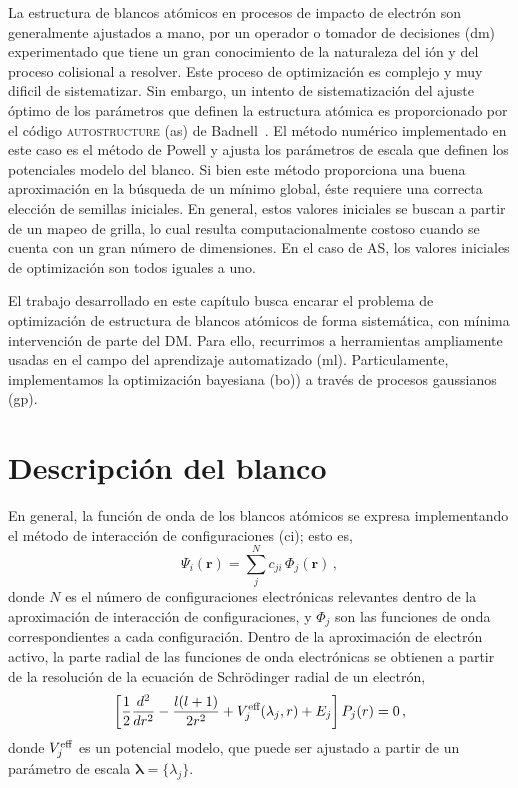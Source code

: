 La estructura de blancos atómicos en procesos de impacto de electrón
son generalmente ajustados a mano, por un operador o tomador de 
decisiones (\acs{dm}) experimentado que tiene un gran conocimiento de la
naturaleza del ión y del proceso colisional a resolver. Este proceso de 
optimización es complejo y muy dificil de sistematizar. Sin embargo, un 
intento de sistematización del ajuste óptimo de los parámetros que 
definen la estructura atómica es proporcionado por el código 
\textsc{autostructure} (\acs{as}) de Badnell~\cite{Badnell:11}. El método 
numérico implementado en este caso es el método de Powell y ajusta los 
parámetros de escala que definen los potenciales modelo del blanco. Si 
bien este método proporciona una buena aproximación en la búsqueda de un 
mínimo global, éste requiere una correcta elección de semillas iniciales. 
En general, estos valores iniciales se buscan a partir de un mapeo de 
grilla, lo cual resulta computacionalmente costoso cuando se cuenta con 
un gran número de dimensiones. En el caso de AS, los valores iniciales de 
optimización son todos iguales a uno.

El trabajo desarrollado en este capítulo busca encarar el problema de 
optimización de estructura de blancos atómicos de forma sistemática, con 
mínima intervención de parte del DM. Para ello, recurrimos a herramientas
ampliamente usadas en el campo del aprendizaje automatizado (\acs{ml}). 
Particulamente, implementamos la optimización bayesiana (\acs{bo})) a 
través de procesos gaussianos (\acs{gp}). 

\section{Descripción del blanco}

En general, la función de onda de los blancos atómicos se expresa 
implementando el método de interacción de configuraciones (\acs{ci}); 
esto es,
\begin{equation*}
\Psi_i(\mathbf{r}) =
\sum_j^{N} c_{ji} \, \Phi_j(\mathbf{r})\,,
\end{equation*}
donde $N$ es el número de configuraciones electrónicas relevantes dentro
de la aproximación de interacción de configuraciones, y $\Phi_j$ son las
funciones de onda correspondientes a cada configuración. Dentro de la 
aproximación de electrón activo, la parte radial de las funciones de 
onda electrónicas se obtienen a partir de la resolución de la ecuación 
de Schr\"odinger radial de un electrón,
\begin{equation*}
\left[ \frac{1}{2} \frac{d^2}{dr^2} - \frac{l(l+1)}{2r^2} 
 + V_j^{\mbox{\scriptsize eff}}(\lambda_j,r)
 + E_j \right] P_j(r)=0\,,
\end{equation*}
donde $V_j^{\mbox{\scriptsize eff}}$ es un potencial modelo, que puede 
ser ajustado a partir de un parámetro de escala 
$\boldsymbol\lambda=\{\lambda_j\}$. 


